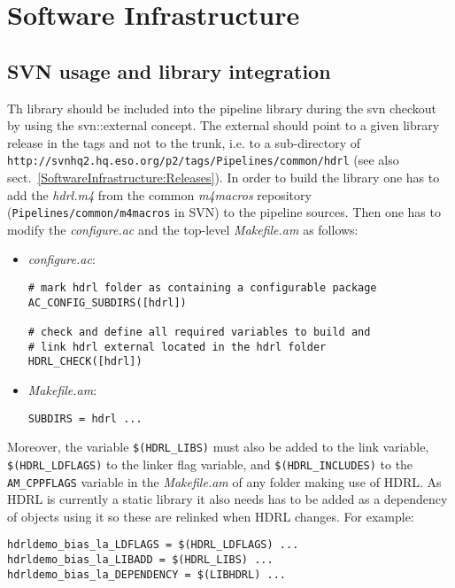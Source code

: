 \section{Software Infrastructure}

\subsection{SVN usage and library integration}
\label{library_integration}

Th \HDRL library should be included into the pipeline library during
the svn checkout by using the svn::external concept. The external
should point to a given library release in the tags and not to the
trunk, i.e. to a sub-directory of
\verb,http://svnhq2.hq.eso.org/p2/tags/Pipelines/common/hdrl, (see
also sect.~\ref{SoftwareInfrastructure:Releases}). In order to build
the library one has to add the \textit{hdrl.m4} from the common
\textit{m4macros} repository (\verb,Pipelines/common/m4macros, in SVN) to the
pipeline sources.
Then one has to modify the \textit{configure.ac} and the top-level
\textit{Makefile.am} as follows:
\begin{itemize}
\item \textit{configure.ac}: 
\begin{verbatim}
# mark hdrl folder as containing a configurable package
AC_CONFIG_SUBDIRS([hdrl])

# check and define all required variables to build and
# link hdrl external located in the hdrl folder
HDRL_CHECK([hdrl])
\end{verbatim}
\item \textit{Makefile.am}:
\begin{verbatim}
SUBDIRS = hdrl ...
\end{verbatim}
\end{itemize}
Moreover, the variable
\verb,$(HDRL_LIBS), must also be added to the link variable,
\verb,$(HDRL_LDFLAGS), to the linker flag variable, and
\verb,$(HDRL_INCLUDES), to the \verb,AM_CPPFLAGS, variable in the
\textit{Makefile.am} of any folder making use of HDRL. As HDRL is
currently a static library it also needs has to be added as a
dependency of objects using it so these are relinked when HDRL
changes. For example:

\begin{verbatim}
hdrldemo_bias_la_LDFLAGS = $(HDRL_LDFLAGS) ...
hdrldemo_bias_la_LIBADD = $(HDRL_LIBS) ...
hdrldemo_bias_la_DEPENDENCY = $(LIBHDRL) ...
\end{verbatim}


